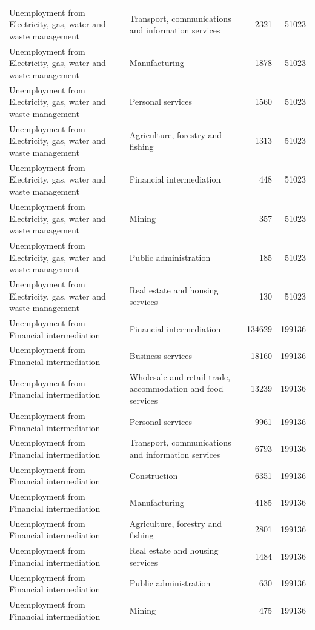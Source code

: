 \begin{longtable}{llrr}
Unemployment from Electricity, gas, water and waste management & Transport, communications and information services & 2321 & 51023 \\
Unemployment from Electricity, gas, water and waste management & Manufacturing & 1878 & 51023 \\
Unemployment from Electricity, gas, water and waste management & Personal services & 1560 & 51023 \\
Unemployment from Electricity, gas, water and waste management & Agriculture, forestry and fishing & 1313 & 51023 \\
Unemployment from Electricity, gas, water and waste management & Financial intermediation & 448 & 51023 \\
Unemployment from Electricity, gas, water and waste management & Mining & 357 & 51023 \\
Unemployment from Electricity, gas, water and waste management & Public administration & 185 & 51023 \\
Unemployment from Electricity, gas, water and waste management & Real estate and housing services & 130 & 51023 \\
Unemployment from Financial intermediation & Financial intermediation & 134629 & 199136 \\
Unemployment from Financial intermediation & Business services & 18160 & 199136 \\
Unemployment from Financial intermediation & Wholesale and retail trade, accommodation and food services & 13239 & 199136 \\
Unemployment from Financial intermediation & Personal services & 9961 & 199136 \\
Unemployment from Financial intermediation & Transport, communications and information services & 6793 & 199136 \\
Unemployment from Financial intermediation & Construction & 6351 & 199136 \\
Unemployment from Financial intermediation & Manufacturing & 4185 & 199136 \\
Unemployment from Financial intermediation & Agriculture, forestry and fishing & 2801 & 199136 \\
Unemployment from Financial intermediation & Real estate and housing services & 1484 & 199136 \\
Unemployment from Financial intermediation & Public administration & 630 & 199136 \\
Unemployment from Financial intermediation & Mining & 475 & 199136 \\

\end{longtable}

